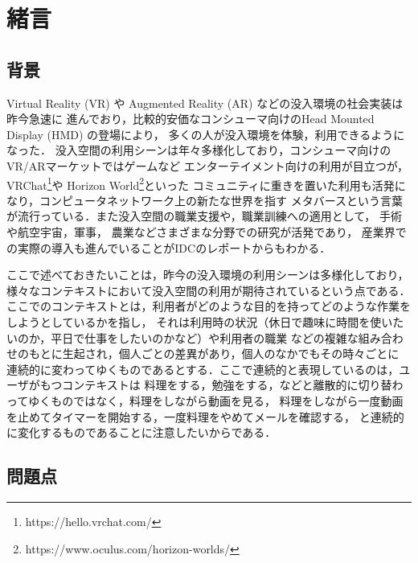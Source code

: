 \chapter{緒言}

\section{背景}

Virtual Reality (VR) や Augmented Reality (AR) などの没入環境の社会実装は昨今急速に
進んでおり，比較的安価なコンシューマ向けのHead Mounted Display (HMD) の登場により，
多くの人が没入環境を体験，利用できるようになった．
没入空間の利用シーンは年々多様化しており，コンシューマ向けのVR/ARマーケットではゲームなど
エンターテイメント向けの利用が目立つが，VRChat\footnote{https://hello.vrchat.com/}や
Horizon World\footnote{https://www.oculus.com/horizon-worlds/}といった
コミュニティに重きを置いた利用も活発になり，コンピュータネットワーク上の新たな世界を指す
メタバースという言葉が流行っている．また没入空間の職業支援や，職業訓練への適用として，
手術\cite{Gallagher2005-gv}や航空宇宙\cite{aerospace}，軍事\cite{military}，
農業\cite{agriculture}などさまざまな分野での研究が活発であり，
産業界での実際の導入も進んでいることがIDCのレポート\cite{idc-2022}からもわかる．

ここで述べておきたいことは，昨今の没入環境の利用シーンは多様化しており，
様々なコンテキストにおいて没入空間の利用が期待されているという点である．
ここでのコンテキストとは，利用者がどのような目的を持ってどのような作業をしようとしているかを指し，
それは利用時の状況（休日で趣味に時間を使いたいのか，平日で仕事をしたいのかなど）や利用者の職業
などの複雑な組み合わせのもとに生起され，個人ごとの差異があり，個人のなかでもその時々ごとに
連続的に変わってゆくものであるとする．ここで連続的と表現しているのは，ユーザがもつコンテキストは
料理をする，勉強をする，などと離散的に切り替わってゆくものではなく，料理をしながら動画を見る，
料理をしながら一度動画を止めてタイマーを開始する，一度料理をやめてメールを確認する，
と連続的に変化するものであることに注意したいからである．


\section{問題点}

